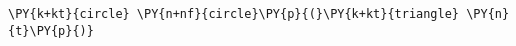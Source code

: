 \begin{Verbatim}[commandchars=\\\{\}]
    \PY{k+kt}{circle} \PY{n+nf}{circle}\PY{p}{(}\PY{k+kt}{triangle} \PY{n}{t}\PY{p}{)}
\end{Verbatim}
